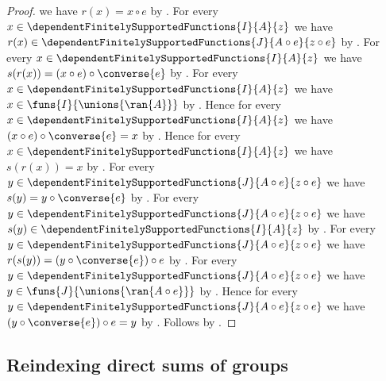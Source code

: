 \begin{proof}
    we have $r(x)=x\circ e$ by
        .
    For every
        $x\in\dependentFinitelySupportedFunctions{I}{A}{z}$
    we have
        $r(x)\in\dependentFinitelySupportedFunctions
            {J}{A\circ e}{z\circ e}$ by
        .
    For every
        $x\in\dependentFinitelySupportedFunctions{I}{A}{z}$
    we have $s(r(x))=(x\circ e)\circ\converse{e}$ by
        .
    For every
        $x\in\dependentFinitelySupportedFunctions{I}{A}{z}$
    we have $x\in\funs{I}{\unions{\ran{A}}}$ by
        .
    Hence for every
        $x\in\dependentFinitelySupportedFunctions{I}{A}{z}$
    we have $(x\circ e)\circ\converse{e}=x$ by
        .
    Hence for every
        $x\in\dependentFinitelySupportedFunctions{I}{A}{z}$
    we have $s(r(x))=x$ by \auto.
    For every
        $y\in\dependentFinitelySupportedFunctions
            {J}{A\circ e}{z\circ e}$
    we have $s(y)=y\circ\converse{e}$ by
        .
    For every
        $y\in\dependentFinitelySupportedFunctions
            {J}{A\circ e}{z\circ e}$
    we have $s(y)\in
        \dependentFinitelySupportedFunctions{I}{A}{z}$ by
        .
    For every
        $y\in\dependentFinitelySupportedFunctions
            {J}{A\circ e}{z\circ e}$
    we have $r(s(y))=(y\circ\converse{e})\circ e$ by
        .
    For every
        $y\in\dependentFinitelySupportedFunctions
            {J}{A\circ e}{z\circ e}$
    we have $y\in\funs{J}{\unions{\ran{A\circ e}}}$ by
        .
    Hence for every
        $y\in\dependentFinitelySupportedFunctions
            {J}{A\circ e}{z\circ e}$
    we have $(y\circ\converse{e})\circ e=y$ by
        .
    Follows by \auto.
\end{proof}

\subsection{Reindexing direct sums of groups}

